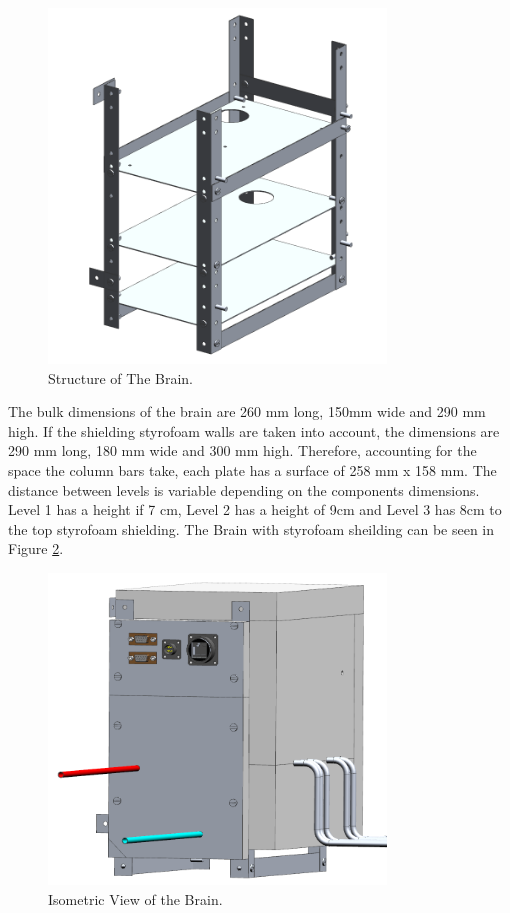 \begin{figure}[H]
    \centering
    \includegraphics[width=0.8\textwidth]{4-experiment-design/img/Mechanical/Brain_Structure.png}
    \caption{Structure of The Brain.}
    \label{brain_structure}
\end{figure}

\smallskip
The bulk dimensions of the brain are 260 mm long, 150mm wide and 290 mm high. If the shielding styrofoam walls are taken into account, the dimensions are 290 mm long, 180 mm wide and 300 mm high.
Therefore, accounting for the space the column bars take, each plate has a surface of 258 mm x 158 mm. The distance between levels is variable depending on the components dimensions. Level 1 has a height if 7 cm, Level 2 has a height of 9cm and Level 3 has 8cm to the top styrofoam shielding. The Brain with styrofoam sheilding can be seen in Figure \ref{brain_isometric}.

\begin{figure}[H]
    \centering
    \includegraphics[width=0.8\textwidth]{4-experiment-design/img/Mechanical/Brain_Isometric.png}
    \caption{Isometric View of the Brain.}
    \label{brain_isometric}
\end{figure}

